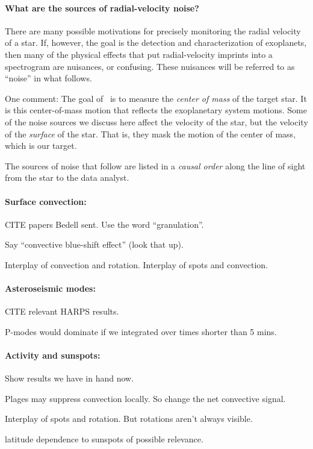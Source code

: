 \documentclass[12pt, fullpage, letterpaper]{article}
\begin{document}
\paragraph{What are the sources of radial-velocity noise?}
There are many possible motivations for precisely monitoring the radial
velocity of a star.
If, however, the goal is the detection and characterization of exoplanets,
then many of the physical effects that put radial-velocity imprints into
a spectrogram are nuisances, or confusing.
These nuisances will be referred to as ``noise'' in what follows.

One comment: The goal of \EPRV\ is to measure the \emph{center of mass} of
the target star.
It is this center-of-mass motion that reflects the exoplanetary system motions.
Some of the noise sources we discuss here affect the velocity of the star,
but the velocity of the \emph{surface} of the star. That is, they mask the
motion of the center of mass, which is our target.

The sources of noise that follow are listed in a \emph{causal order} along the
line of sight from the star to the data analyst.

\paragraph{Surface convection:}
CITE papers Bedell sent. Use the word ``granulation''.

Say ``convective blue-shift effect'' (look that up).

Interplay of convection and rotation. Interplay of spots and convection.

\paragraph{Asteroseismic modes:}
CITE relevant HARPS results.

P-modes would dominate if we integrated over times shorter than 5 mins.

\paragraph{Activity and sunspots:}
Show results we have in hand now.

Plages may suppress convection locally. So change the net convective signal.

Interplay of spots and rotation. But rotations aren't always visible.

latitude dependence to sunspots of possible relevance.
\end{document}
